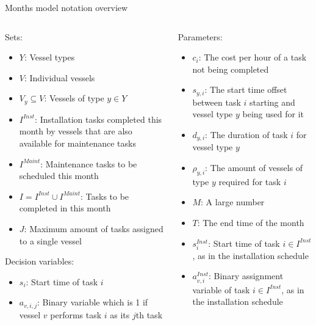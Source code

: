 \documentclass{beamer}
\begin{document}
\begin{frame}{Months model notation overview}
\scriptsize
\begin{columns}
\begin{column}{.48\textwidth}
Sets:
\begin{itemize}
\item $Y$: Vessel types
\item $V$: Individual vessels
\item $V_y \subseteq V$: Vessels of type $y \in Y$ 
\item $I^{Inst}$:  Installation tasks completed this month by vessels that are also available for maintenance tasks
\item $I^{Maint}$: Maintenance tasks to be scheduled this month
\item $I = I^{Inst} \cup I^{Maint}$:  Tasks to be completed in this month
\item $J$: Maximum amount of tasks assigned to a single vessel
\end{itemize}

Decision variables:
\begin{itemize}
\item $s_i$: Start time of task $i$
\item $a_{v,i,j}$: Binary variable which is 1 if vessel $v$ performs task $i$ as its $j$th task
\end{itemize}
\end{column}

\hfill

\begin{column}{.48\textwidth}
Parameters:
\begin{itemize}
\item $c_i$: The cost per hour of a task not being completed
\item $s_{y,i}$: The start time offset between task $i$ starting and vessel type $y$ being used for it
\item $d_{y,i}$: The duration of task $i$ for vessel type $y$
\item $\rho_{y,i}$: The amount of vessels of type $y$ required for task $i$
\item $M$: A large number
\item $T$: The end time of the month
\item $s^{Inst}_i$: Start time of task $i \in I^{Inst}$, as in the installation schedule
\item $a^{Inst}_{v,i}$: Binary assignment variable of task $i \in I^{Inst}$, as in the installation schedule
\end{itemize}
\end{column}
\end{columns}
\end{frame}
\end{document}
